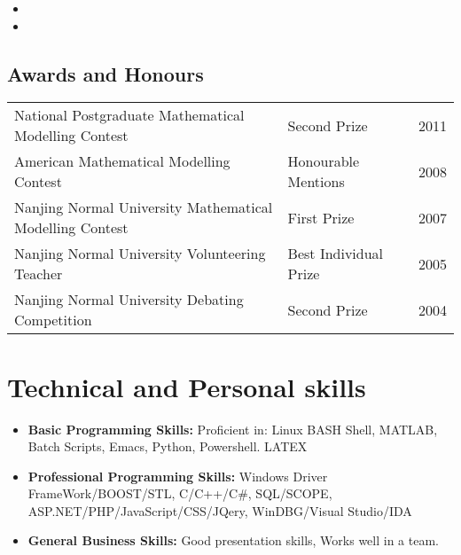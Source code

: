 \documentclass[11pt,a4paper,sans]{moderncv}        %
\begin{document}
\vspace{5pt}

\begin{itemize}

\item{}

\item{}

\end{itemize}

\vspace{2pt}

\subsection{Awards and Honours}

\vspace{5pt}

\begin{tabular}{lll}
National Postgraduate Mathematical Modelling Contest $\quad$ & Second Prize $\quad$ & 2011\\
American Mathematical Modelling Contest $\quad$ & Honourable Mentions $\quad$ & 2008\\
Nanjing Normal University Mathematical Modelling Contest $\quad$ & First Prize $\quad$ & 2007\\
Nanjing Normal University Volunteering Teacher $\quad$ & Best Individual Prize $\quad$ & 2005 \\
Nanjing Normal University Debating Competition $\quad$ & Second Prize $\quad$ & 2004
\end{tabular}

\section{Technical and Personal skills}

\vspace{6pt}

\begin{itemize}

\item \textbf{Basic Programming Skills:} Proficient in: Linux BASH Shell, MATLAB, Batch Scripts, Emacs, Python, Powershell. LATEX

\vspace{6pt}

\item \textbf{Professional Programming Skills:} Windows Driver FrameWork/BOOST/STL, C/C++/C\#, SQL/SCOPE, ASP.NET/PHP/JavaScript/CSS/JQery, WinDBG/Visual Studio/IDA

\vspace{6pt}

\item \textbf{General Business Skills:} Good presentation skills, Works well in a team.

\end{itemize}
\end{document}

